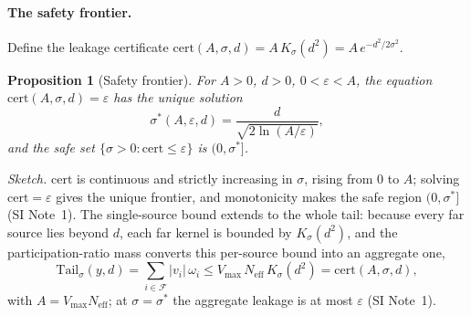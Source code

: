 \documentclass[10pt,twocolumn]{article}
\newtheorem{proposition}{Proposition}
\newcommand{\Ksig}{K_{\sigma}}
\newcommand{\sstar}{\sigma^{*}}
\newcommand{\Neff}{N_{\mathrm{eff}}}
\begin{document}
\paragraph{The safety frontier.} Define the leakage certificate $\mathrm{cert}(A,\sigma,d)=A\,\Ksig(d^2)=A\,e^{-d^2/2\sigma^2}$.
\begin{proposition}[Safety frontier]\label{prop:frontier}
For $A>0$, $d>0$, $0<\varepsilon<A$, the equation $\mathrm{cert}(A,\sigma,d)=\varepsilon$ has the unique solution
\begin{equation}\label{eq:sstar}
\sstar(A,\varepsilon,d)=\frac{d}{\sqrt{2\ln(A/\varepsilon)}},
\end{equation}
and the safe set $\{\sigma>0:\mathrm{cert}\le\varepsilon\}$ is $(0,\sstar]$.
\end{proposition}
\noindent\emph{Sketch.} $\mathrm{cert}$ is continuous and strictly increasing in $\sigma$, rising from $0$ to $A$; solving $\mathrm{cert}=\varepsilon$ gives the unique frontier, and monotonicity makes the safe region $(0,\sstar]$ (SI Note~1). The single-source bound extends to the whole tail: because every far source lies beyond $d$, each far kernel is bounded by $\Ksig(d^2)$, and the participation-ratio mass converts this per-source bound into an aggregate one,
\begin{equation}\label{eq:aggbound}
\mathrm{Tail}_\sigma(y,d)=\sum_{i\in\mathcal{F}}|v_i|\,\omega_i\le V_{\max}\,\Neff\,\Ksig(d^2)=\mathrm{cert}(A,\sigma,d),
\end{equation}
with $A=V_{\max}\Neff$; at $\sigma=\sstar$ the aggregate leakage is at most $\varepsilon$ (SI Note~1).
\end{document}
